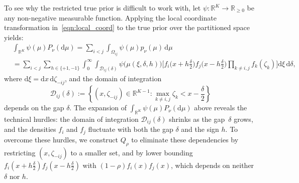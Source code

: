 \documentclass[10pt]{article}
\newcommand{\dd}{\mathrm{d}}
\theoremstyle{plain}
\begin{document}
\begin{remark} To see why the restricted true prior is difficult to work with, let $\psi: \mathbb{R}^K \to \mathbb{R}_{\ge 0}$ be any non-negative measurable function. Applying the local coordinate transformation in~\eqref{eqn:local_coord} to the true prior over the partitioned space yields:
$$
\begin{aligned}
&\int_{\mathbb{R}^K} \psi(\mu) P_\nu(\dd\mu)
= \sum_{i<j} \int_{\Omega_{ij}} \psi(\mu) p_\nu(\mu) \,\dd\mu \\
&= \sum_{i<j} \sum_{h \in \{+1, -1\}} \int_0^\infty \int_{\mathcal{D}_{ij}(\delta)} \psi\bigl(\mu(\xi, \delta, h)\bigr) \bigg[ f_i\Big(x + h\frac{\delta}{2}\Big) f_j\Big(x - h\frac{\delta}{2}\Big) \prod_{k \neq i,j} f_k(\zeta_k) \bigg] \dd\xi \, \dd\delta, 
\end{aligned}
$$
where $\dd\xi = \dd x \, \dd\zeta_{-ij}$, and the   domain of integration 
$$\mathcal{D}_{ij}(\delta) := \left\{ (x, \zeta_{-ij}) \in \mathbb{R}^{K-1} : \max_{k \neq i,j} \zeta_k < x - \frac{\delta}{2} \right\}$$
depends on the gap $\delta$.
The expansion of $\int_{\mathbb{R}^K} \psi(\mu) P_\nu(\dd\mu)$ above reveals the technical hurdles: the domain of integration $\mathcal{D}_{ij}(\delta)$ shrinks as the gap~$\delta$ grows, and the densities $f_i$ and $f_j$ fluctuate with both the gap $\delta$ and the sign $h$. To overcome these hurdles, we construct $Q_\rho$ to eliminate these dependencies by restricting $(x,\zeta_{-ij})$ to a smaller  set, and by lower bounding $f_i\left(x + h\frac{\delta}{2}\right) f_j \left(x - h\frac{\delta}{2}\right)$ with $(1-\rho)f_i(x)f_j(x)$, which  depends on neither $\delta$ nor $h$.  
\end{remark} 
\end{document}
